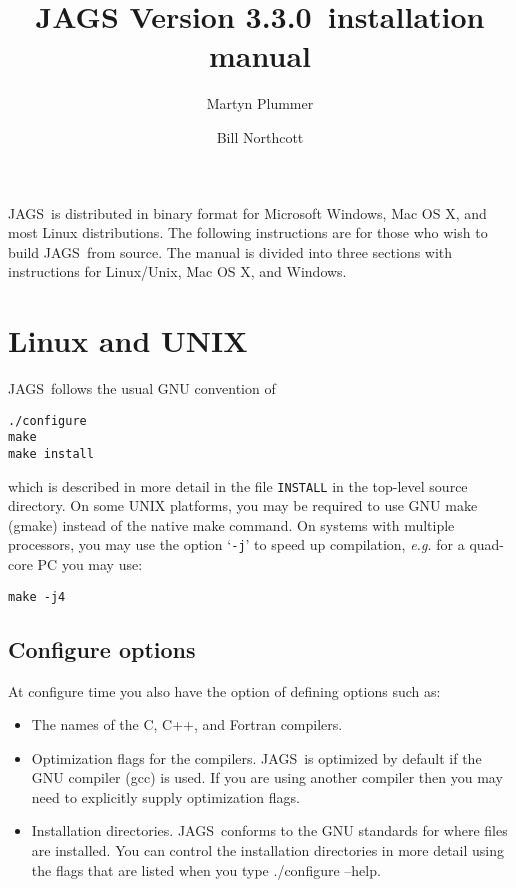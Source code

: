\documentclass[11pt, a4paper, titlepage]{article}
\newcommand{\release}{3.3.0}
\newcommand{\JAGS}{\textsf{JAGS}}
\newcommand{\code}[1]{{\bgroup{\normalfont\ttfamily #1}\egroup}}
\newcommand{\samp}[1]{{`\bgroup\normalfont\texttt{#1}'\egroup}}
\let\command=\code
\let\option=\samp
\begin{document}
\title{JAGS Version \release\ installation manual}
\author{Martyn Plummer \and Bill Northcott}
\maketitle

\JAGS\ is distributed in binary format for Microsoft Windows, Mac OS
X, and most Linux distributions.  The following instructions are for
those who wish to build \JAGS\ from source. The manual is divided
into three sections with instructions for Linux/Unix, Mac OS X, and Windows.

\section{Linux and UNIX}

\JAGS\ follows the usual GNU convention of 
\begin{verbatim}
./configure
make
make install
\end{verbatim}
which is described in more detail in the file \texttt{INSTALL} in
the top-level source directory. On some UNIX platforms, you may
be required to use GNU make (gmake) instead of the native make
command. On systems with multiple processors, you may use the option 
\option{-j} to speed up compilation, {\em e.g.} for a quad-core PC you
may use:
\begin{verbatim}
make -j4
\end{verbatim}

\subsection{Configure options}

At configure time you also have the option of defining options such
as:
\begin{itemize}
\item The names of the C, C++, and Fortran compilers.  
\item Optimization flags for the compilers.  \JAGS\ is optimized by
  default if the GNU compiler (gcc) is used. If you are using another
  compiler then you may need to explicitly supply optimization flags.
\item Installation directories. \JAGS\ conforms to the GNU standards
  for where files are installed. You can control the installation
  directories in more detail using the flags that are listed when
  you type \command{./configure --help}.
\end{itemize}
\end{document}
